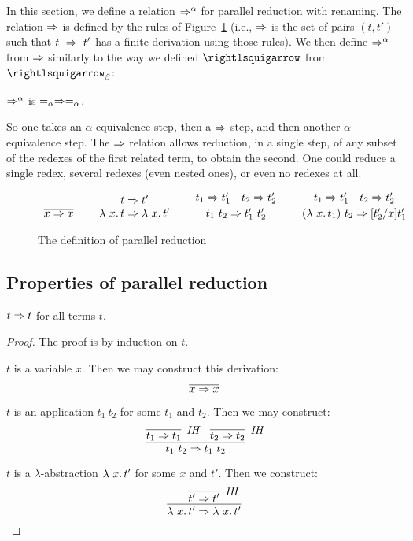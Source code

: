 In this section, we define a relation $\Rightarrow^\alpha$ for parallel reduction with renaming.  The relation $\Rightarrow$ is defined
by the rules of Figure~\ref{fig:pred} (i.e., $\Rightarrow$ is the set of pairs $(t,t')$ such that $t\ \Rightarrow\ t'$ has a finite
derivation using those rules).  We then define $\Rightarrow^\alpha$ from $\Rightarrow$ similarly to the way we defined $\betaa$ from
$\betaa_\beta$:

\begin{definition}
  $\Rightarrow^\alpha$ is $=_\alpha\Rightarrow =_\alpha$.
\end{definition}
\noindent So one takes an $\alpha$-equivalence step, then a $\Rightarrow$ step, and then another $\alpha$-equivalence step.
The $\Rightarrow$ relation allows reduction, in a single step, of any subset of the redexes of the first related term,
to obtain the second.  One could reduce a single redex, several redexes (even nested ones), or even no redexes at all.

\newcommand{\predvar}[0]{\infer{x \Pred x}{\ }}

\newcommand{\predlam}[0]{\infer{\lam{x}{t} \Pred \lam{x}{t'}}{t \Pred t'}}

\newcommand{\predapp}[0]{\infer{t_1\ t_2 \Pred t_1'\ t_2'}{t_1 \Pred t_1' & t_2 \Pred t_2'}}

\newcommand{\predbeta}[0]{\infer{(\lam{x}{t_1})\ t_2 \Pred [t_2'/x]t_1'}{t_1 \Pred t_1' & t_2 \Pred t_2'}}

\begin{figure}
\[
\begin{array}{lllllll}
\predvar

& \ &

\predlam

& \ &

\predapp

& \ &

\predbeta
 
\end{array}
\]
\caption{The definition of parallel reduction}
\label{fig:pred}
\end{figure}

\subsection{Properties of parallel reduction}

\begin{lemma}
  \label{lem:predrefl}
  $t \Rightarrow t$ for all terms $t$.
\end{lemma}
\begin{proof}
  The proof is by induction on $t$.

  \case{ } $t$ is a variable $x$. Then we may construct this derivation:
  \[
  \infer{x \Pred x}{\ }
  \]
  
\case{ } $t$ is an application $t_1\ t_2$ for some $t_1$ and $t_2$. Then we may construct:
\[
\infer{t_1\ t_2 \Pred t_1\ t_2}{\infer[\textit{IH}]{t_1 \Pred t_1}{\ } & \infer[\textit{IH}]{t_2 \Pred t_2}{\ }}
\]

\case{ } $t$ is a $\lambda$-abstraction $\lambda\ x.\, t'$ for some $x$ and $t'$. Then we construct:
\[
\infer{\lam{x}{t'} \Pred \lam{x}{t'}}{\infer[\textit{IH}]{t' \Pred t'}{\ }}
\]
\end{proof}

